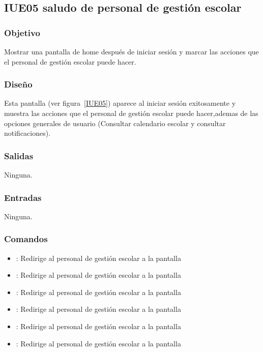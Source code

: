 \subsection{IUE05 saludo de personal de gestión escolar}

\subsubsection{Objetivo}
Mostrar una pantalla de home después de iniciar sesión y marcar las acciones que el personal de gestión escolar puede hacer.

\subsubsection{Diseño}
Esta pantalla  (ver figura~\ref{IUE05}) aparece al iniciar sesión exitosamente y muestra las acciones que el personal de gestión escolar puede hacer,ademas de las opciones generales de usuario (Consultar calendario escolar y consultar notificaciones). 


\subsubsection{Salidas}

Ninguna.

\subsubsection{Entradas}
Ninguna.

\subsubsection{Comandos}
\begin{itemize}
	\item {}: Redirige al personal de gestión escolar a la pantalla 
	\item {}: Redirige al personal de gestión escolar a la pantalla 
	\item {}: Redirige al personal de gestión escolar a la pantalla 
	\item {}: Redirige al personal de gestión escolar a la pantalla 
	\item {}: Redirige al personal de gestión escolar a la pantalla 
	\item {}: Redirige al personal de gestión escolar a la pantalla 
	
\end{itemize}


